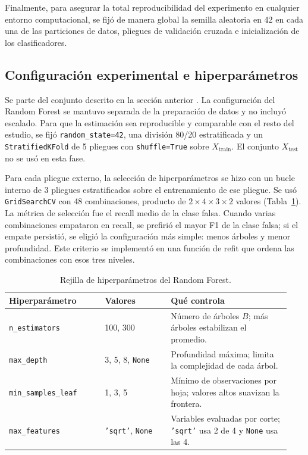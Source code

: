 \documentclass[conference]{IEEEtran}
\begin{document}
	Finalmente, para asegurar la total reproducibilidad del experimento en cualquier entorno computacional, se fijó de manera global la semilla aleatoria en 42 en cada una de las particiones de datos, pliegues de validación cruzada e inicialización de los clasificadores.

    \subsection{Configuración experimental e hiperparámetros}
    \label{sec:rf-metodologia}
    
    Se parte del conjunto descrito en la sección anterior \cite{uci_banknote}. La configuración del Random Forest se mantuvo separada de la preparación de datos y no incluyó escalado. Para que la estimación sea reproducible y comparable con el resto del estudio, se fijó \texttt{random\_state=42}, una división 80/20 estratificada y un \texttt{StratifiedKFold} de 5 pliegues con \texttt{shuffle=True} sobre $X_{\text{train}}$. El conjunto $X_{\text{test}}$ no se usó en esta fase.
    
    Para cada pliegue externo, la selección de hiperparámetros se hizo con un bucle interno de 3 pliegues estratificados sobre el entrenamiento de ese pliegue. Se usó \texttt{GridSearchCV} con 48 combinaciones, producto de $2\times4\times3\times2$ valores (Tabla~\ref{tab:rf-grid}). La métrica de selección fue el recall medio de la clase falsa. Cuando varias combinaciones empataron en recall, se prefirió el mayor F1 de la clase falsa; si el empate persistió, se eligió la configuración más simple: menos árboles y menor profundidad. Este criterio se implementó en una función de refit que ordena las combinaciones con esos tres niveles.
    
    \begin{table}[t]
    	\centering
    	\caption{Rejilla de hiperparámetros del Random Forest.}
    	\label{tab:rf-grid}
    	\begin{tabular}{@{}p{0.32\linewidth}p{0.22\linewidth}p{0.40\linewidth}@{}}
    		\toprule
    		Hiperparámetro & Valores & Qué controla \\
    		\midrule
    		\texttt{n\_estimators} & 100, 300 & Número de árboles $B$; más árboles estabilizan el promedio. \\
    		\texttt{max\_depth} & 3, 5, 8, \texttt{None} & Profundidad máxima; limita la complejidad de cada árbol. \\
    		\texttt{min\_}\allowbreak\texttt{samples\_}\allowbreak\texttt{leaf} & 1, 3, 5 & Mínimo de observaciones por hoja; valores altos suavizan la frontera. \\
    		\texttt{max\_}\allowbreak\texttt{features} & \texttt{'sqrt'}, \texttt{None} & Variables evaluadas por corte; \texttt{'sqrt'} usa 2 de 4 y \texttt{None} usa las 4. \\
    		\bottomrule
    	\end{tabular}
    \end{table}
    
\end{document}
